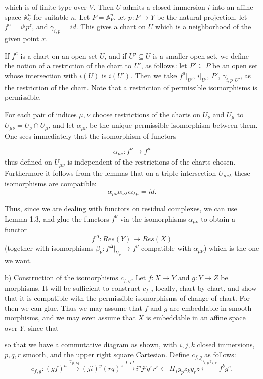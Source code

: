 \documentclass[12pt]{book}
\begin{document}
\setcounter{page}{326}
which is of finite type over \(V\).
Then \(U\) admits a closed immersion \(i\) into an affine space \(\mathbb{A}_{V}^{n}\) for suitable \(n\).
Let \(P=\mathbb{A}_{V}^{n}\), let \(p: P \to Y\) be the natural projection, let \(f^{a}=i^{y} p^{z}\), and \(\gamma_{i,p}=id\).
This gives a chart on \(U\) which is a neighborhood of the given point \(x\).

If \(f^{a}\) is a chart on an open set \(U\), and if \(U' \subseteq U\) is a smaller open set, we define the notion of a restriction of the chart to \(U'\), as follows: let \(P' \subseteq P\) be an open set whose intersection with \(i(U)\) is \(i(U')\).
Then we take \(f^{a}|_{U'}\), \(i|_{U'}\), \(P'\), \(\gamma_{i,p}|_{U'}\), as the restriction of the chart.
Note that a restriction of permissible isomorphisms is permissible.

For each pair of indices \(\mu,\nu\) choose restrictions of the charts on \(U_{\nu}\) and \(U_{\mu}\) to \(U_{\mu\nu}=U_{\nu}\cap U_{\mu}\), and let \(\alpha_{\mu\nu}\) be the unique permissible isomorphism between them.
One sees immediately that the isomorphism of functors

\setcounter{page}{327}
\[\alpha_{\mu\nu}: f^{\nu} \to f^{\mu}\]
thus defined on \(U_{\mu\nu}\) is independent of the restrictions of the charts chosen.
Furthermore it follows from the lemmas that on a triple intersection \(U_{\mu\nu\lambda}\) these isomorphisms are compatible:
\[\alpha_{\mu\nu}\alpha_{\nu\lambda}\alpha_{\lambda\mu}=id .\]

Thus, since we are dealing with functors on residual complexes, we can use Lemma 1.3, and glue the functors \(f^{\nu}\) via the isomorphisms \(\alpha_{\mu\nu}\) to obtain a functor
\[f^{\Delta}: Res(Y) \to Res(X)\]
(together with isomorphisms \(\beta_{\nu}:f^{\Delta}|_{U_{\nu}} \to f^{\nu}\) compatible with \(\alpha_{\mu\nu}\)) which is the one we want.

b) Construction of the isomorphisms \(c_{f,g}\).
Let \(f: X \to Y\) and \(g: Y \to Z\) be morphisms.
It will be sufficient to construct \(c_{f,g}\) locally, chart by chart, and show that it is compatible with the permissible isomorphisms of change of chart.
For then we can glue.
Thus we may assume that \(f\) and \(g\) are embeddable in smooth morphisms, and we may even assume that \(X\) is embeddable in an affine space over \(Y\), since that

\setcounter{page}{328}
so that we have a commutative diagram as shown, with \(i,j,k\) closed immersions, \(p,q,r\) smooth, and the upper right square Cartesian.
Define \(c_{f,g}\) as follows:
\[c_{f,g}:(g f)^{a} \stackrel{\gamma_{ji,rq}}{\to}(j i)^{y}(r q)^{z} \stackrel{I,\Pi}{\to} i^{y} j^{y} q^{z} r^{z} \leftarrow \Pi_{i} y_{p} z_{k} y_{r} z \stackrel{\gamma_{i,p}\gamma_{k,r}}{\leftarrow} f^{b} g^{c} .\]
\end{document}
